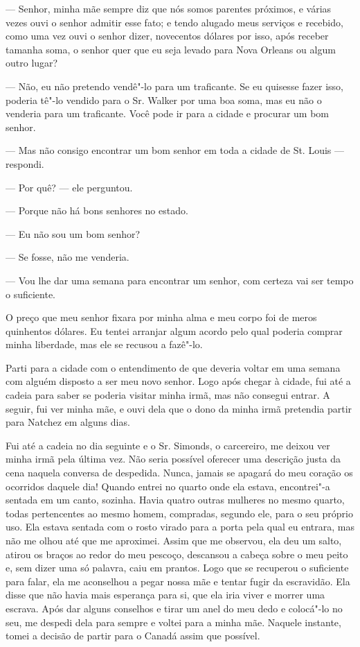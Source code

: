 --- Senhor, minha mãe sempre diz que nós somos parentes próximos, e
várias vezes ouvi o senhor admitir esse fato; e tendo alugado meus
serviços e recebido, como uma vez ouvi o senhor dizer, novecentos
dólares por isso, após receber tamanha soma, o senhor quer que eu seja
levado para Nova Orleans ou algum outro lugar?

--- Não, eu não pretendo vendê"-lo para um traficante. Se eu quisesse
fazer isso, poderia tê"-lo vendido para o Sr. Walker por uma boa soma,
mas eu não o venderia para um traficante. Você pode ir para a cidade e
procurar um bom senhor.

--- Mas não consigo encontrar um bom senhor em toda a cidade de St.
Louis --- respondi.

--- Por quê? --- ele perguntou.

--- Porque não há bons senhores no estado.

--- Eu não sou um bom senhor?

--- Se fosse, não me venderia.

--- Vou lhe dar uma semana para encontrar um senhor, com certeza vai ser
tempo o suficiente.

O preço que meu senhor fixara por minha alma e meu corpo foi de meros
quinhentos dólares. Eu tentei arranjar algum acordo pelo qual poderia
comprar minha liberdade, mas ele se recusou a fazê"-lo.

Parti para a cidade com o entendimento de que deveria voltar em uma
semana com alguém disposto a ser meu novo senhor. Logo após chegar à
cidade, fui até a cadeia para saber se poderia visitar minha irmã, mas
não consegui entrar. A seguir, fui ver minha mãe, e ouvi dela que o dono
da minha irmã pretendia partir para Natchez em alguns dias.

Fui até a cadeia no dia seguinte e o Sr. Simonds, o carcereiro, me
deixou ver minha irmã pela última vez. Não seria possível oferecer uma
descrição justa da cena naquela conversa de despedida. Nunca, jamais se
apagará do meu coração os ocorridos daquele dia! Quando entrei no quarto
onde ela estava, encontrei"-a sentada em um canto, sozinha. Havia quatro
outras mulheres no mesmo quarto, todas pertencentes ao mesmo homem,
compradas, segundo ele, para o seu próprio uso. Ela estava sentada com o
rosto virado para a porta pela qual eu entrara, mas não me olhou até que
me aproximei. Assim que me observou, ela deu um salto, atirou os braços
ao redor do meu pescoço, descansou a cabeça sobre o meu peito e, sem
dizer uma só palavra, caiu em prantos. Logo que se recuperou o
suficiente para falar, ela me aconselhou a pegar nossa mãe e tentar
fugir da escravidão. Ela disse que não havia mais esperança para si, que
ela iria viver e morrer uma escrava. Após dar alguns conselhos e tirar
um anel do meu dedo e colocá"-lo no seu, me despedi dela para sempre e
voltei para a minha mãe. Naquele instante, tomei a decisão de partir
para o Canadá assim que possível.


